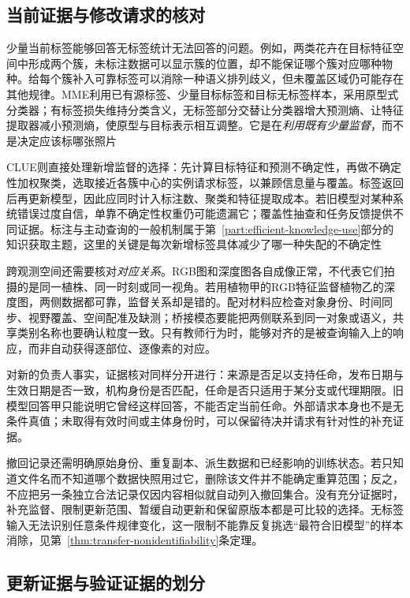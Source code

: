 \subsection{当前证据与修改请求的核对}
\label{sec:ket-update-current-evidence}

少量当前标签能够回答无标签统计无法回答的问题。例如，两类花卉在目标特征空间中形成两个簇，未标注数据可以显示簇的位置，却不能保证哪个簇对应哪种物种。给每个簇补入可靠标签可以消除一种语义排列歧义，但未覆盖区域仍可能存在其他规律。MME利用已有源标签、少量目标标签和目标无标签样本，采用原型式分类器；有标签损失维持分类含义，无标签部分交替让分类器增大预测熵、让特征提取器减小预测熵，使原型与目标表示相互调整。它是在\emph{利用既有少量监督}，而不是决定应该标哪张照片

CLUE则直接处理新增监督的选择：先计算目标特征和预测不确定性，再做不确定性加权聚类，选取接近各簇中心的实例请求标签，以兼顾信息量与覆盖。标签返回后再更新模型，因此应同时计入标注数、聚类和特征提取成本。若旧模型对某种系统错误过度自信，单靠不确定性权重仍可能遗漏它；覆盖性抽查和任务反馈提供不同证据。标注与主动查询的一般机制属于第~\ref{part:efficient-knowledge-use}部分的知识获取主题，这里的关键是每次新增标签具体减少了哪一种失配的不确定性

跨观测空间还需要核对\emph{对应关系}。RGB图和深度图各自成像正常，不代表它们拍摄的是同一植株、同一时刻或同一视角。若用植物甲的RGB特征监督植物乙的深度图，两侧数据都可靠，监督关系却是错的。配对材料应检查对象身份、时间同步、视野覆盖、空间配准及缺测；桥接模态要能把两侧联系到同一对象或语义，共享类别名称也要确认粒度一致。只有教师行为时，能够对齐的是被查询输入上的响应，而非自动获得逐部位、逐像素的对应。

对新的负责人事实，证据核对同样分开进行：来源是否足以支持任命，发布日期与生效日期是否一致，机构身份是否匹配，任命是否只适用于某分支或代理期限。旧模型回答甲只能说明它曾经这样回答，不能否定当前任命。外部请求本身也不是无条件真值；未取得有效时间或主体身份时，可以保留待决并请求有针对性的补充证据。

撤回记录还需明确原始身份、重复副本、派生数据和已经影响的训练状态。若只知道文件名而不知道哪个数据快照用过它，删除该文件并不能确定重算范围；反之，不应把另一条独立合法记录仅因内容相似就自动列入撤回集合。没有充分证据时，补充监督、限制更新范围、暂缓自动更新和保留原版本都是可比较的选择。无标签输入无法识别任意条件规律变化，这一限制不能靠反复挑选“最符合旧模型”的样本消除，见第~\ref{thm:transfer-nonidentifiability}条定理。

\subsection{更新证据与验证证据的划分}
\label{sec:ket-update-split}

